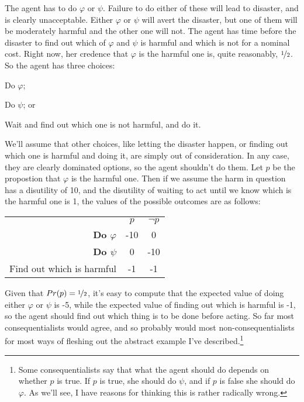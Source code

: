 \documentclass[11pt,oneside]{book}
\begin{document}
The agent has to do $\varphi$ or $\psi$. Failure to do either of these will lead to disaster, and is clearly unacceptable. Either $\varphi$ or $\psi$ will avert the disaster, but one of them will be moderately harmful and the other one will not. The agent has time before the disaster to find out which of $\varphi$ and $\psi$ is harmful and which is not for a nominal cost. Right now, her credence that $\varphi$ is the harmful one is, quite reasonably, $\nicefrac{1}{2}$. So the agent has three choices:

\begin{itemize*}
\item Do $\varphi$;
\item Do $\psi$; or
\item Wait and find out which one is not harmful, and do it.
\end{itemize*}

\noindent We'll assume that other choices, like letting the disaster happen, or finding out which one is harmful and doing it, are simply out of consideration. In any case, they are clearly dominated options, so the agent shouldn't do them. Let $p$ be the propostion that $\varphi$ is the harmful one. Then if we assume the harm in question has a disutility of 10, and the disutility of waiting to act until we know which is the harmful one is 1, the values of the possible outcomes are as follows:

\begin{center}
\begin{tabular}{r c c}
 & $p$ & $\neg p$ \\
\textbf{Do $\varphi$} & -10 & 0 \\
\textbf{Do $\psi$} & 0 & -10 \\
Find out which is harmful & -1 & -1 \\
\end{tabular}
\end{center}

\noindent Given that $Pr(p) = \nicefrac{1}{2}$, it's easy to compute that the expected value of doing either $\varphi$ or $\psi$ is -5, while the expected value of finding out which is harmful is -1, so the agent should find out which thing is to be done before acting. So far most consequentialists would agree, and so probably would most non-consequentialists for most ways of fleshing out the abstract example I've described.\footnote{Some consequentialists say that what the agent should do depends on whether $p$ is true. If $p$ is true, she should do $\psi$, and if $p$ is false she should do $\varphi$. As we'll see, I have reasons for thinking this is rather radically wrong.}
\end{document}
